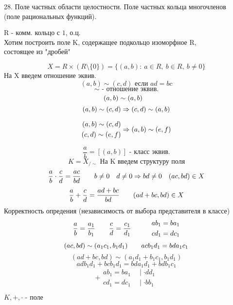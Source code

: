 \documentclass[12pt, fleqn]{article}
\begin{document}
\begin{question} {28. Поле частных области целостности. Поле частных кольца многочленов \\(поле рациональных функций).}
    
    \begin{definition} 
        R - комм. кольцо с $1$, о.ц.\\
        Хотим построить поле K, содержащее подкольцо изоморфное R, \\ состоящее из "дробей"
    
        \[X = R \times (R \setminus \{0\}) = \{(a, b) : \ a \in R, \  b \in R, \  b \neq 0\}\]
        На X введем отношение эквив.
        \[(a, b) \sim (c, d) \text{ если } ad = bc\]
        \[\sim \text{ - отношение эквив.}\]
        \[(a, b) \sim (a, b) \quad\]
        \[(a, b) \sim (c, d) \Rightarrow (c, d) \sim (a, b)\]

        \[\begin{align}
            (a,b) \sim (c, d)\\
            (c, d) \sim (e, f)
        \end{align}
        \Rightarrow (a, b) \sim (e, f)
        \]

        \[\frac{a}{b} = [(a, b)] \text{ - класс эквив.} \]
        \[K = X_{/\sim} \text{ На K введем структуру поля}\]
        \[\frac{a}{b} \cdot \frac{c}{d} = \frac{ac}{bd} \quad \quad b \neq 0 \quad d \neq 0 \Rightarrow bd \neq 0 \quad (ac, bd) \in X\]
        \[\frac{a}{b} + \frac{c}{d} = \frac{ad + bc}{bd} \quad\quad (ad + bc, bd) \in X\]
        Корректность опредения (независимость от выбора представителя в классе)
        \[\frac{a}{b} = \frac{a_1}{b_1} \quad\quad \frac{c}{d} = \frac{c_1}{d_1} \quad\quad\quad
        \begin{align} 
            ab_1 = ba_1\\
            cd_1 = dc_1
        \end{align}\]
        \[(ac, bd) \sim (a_1 c_1, b_1 d_1) \quad\quad a c b_1 d_1 = bd a_1 c_1\]
        \[(ad + bc, bd) \sim (a_1 d_1 + b_1 c_1, b_1 d_1)\]
        \[ad b_1 d_1 + bc b_1 d_1 = bd a_1 d_1 + bd b_1 c_1\]
        \[+ \begin{align} 
            ab_1 = ba_1 & \ \mid \cdot dd_1\\
            cd_1 = dc_1 & \ \mid \cdot bb_1
        \end{align}\]

        \begin{theorem} 
            $K, +, \cdot \text{ - поле} $
        \end{theorem}


\end{definition}
\end{question}
\end{document}
